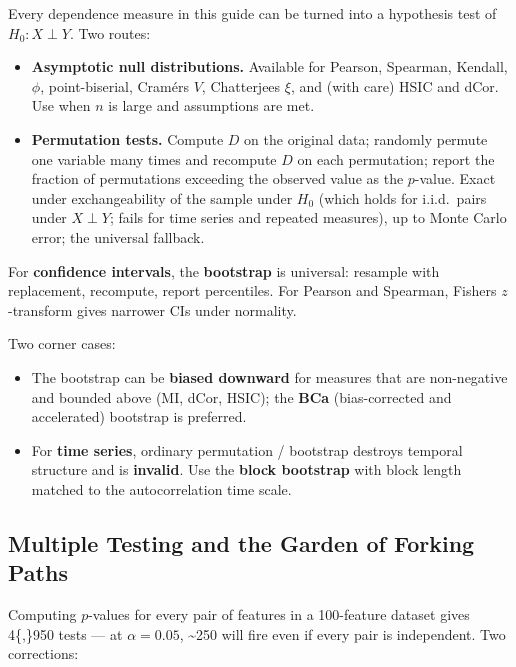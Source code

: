 \documentclass{article}
\providecommand{\tightlist}{\setlength{\itemsep}{0pt}\setlength{\parskip}{0pt}}
\begin{document}
Every dependence measure in this guide can be turned into a hypothesis
test of \(H_0: X \perp Y\). Two routes:

\begin{itemize}
\tightlist
\item
  \textbf{Asymptotic null distributions.} Available for Pearson,
  Spearman, Kendall, \(\phi\), point-biserial, Cramér\textquotesingle s
  \(V\), Chatterjee\textquotesingle s \(\xi\), and (with care) HSIC and
  dCor. Use when \(n\) is large and assumptions are met.
\item
  \textbf{Permutation tests.} Compute \(D\) on the original data;
  randomly permute one variable many times and recompute \(D\) on each
  permutation; report the fraction of permutations exceeding the
  observed value as the \(p\)-value. Exact under exchangeability of the
sample under \(H_0\) (which holds for i.i.d.\ pairs under \(X \perp Y\);
fails for time series and repeated measures), up to Monte
  Carlo error; the universal fallback.
\end{itemize}

For \textbf{confidence intervals}, the \textbf{bootstrap} is universal:
resample with replacement, recompute, report percentiles. For Pearson
and Spearman, Fisher\textquotesingle s \(z\)-transform gives narrower
CIs under normality.

Two corner cases:

\begin{itemize}
\tightlist
\item
  The bootstrap can be \textbf{biased downward} for measures that are
  non-negative and bounded above (MI, dCor, HSIC); the \textbf{BCa}
  (bias-corrected and accelerated) bootstrap is preferred.
\item
  For \textbf{time series}, ordinary permutation / bootstrap destroys
  temporal structure and is \textbf{invalid}. Use the \textbf{block
  bootstrap} with block length matched to the autocorrelation time
  scale.
\end{itemize}

\subsection{Multiple Testing and the Garden of Forking
Paths}\label{multiple-testing-and-the-garden-of-forking-paths}

Computing \(p\)-values for every pair of features in a 100-feature
dataset gives 4\{,\}950 tests --- at \(\alpha = 0.05\),
\textasciitilde250 will fire even if every pair is independent. Two
corrections:
\end{document}
